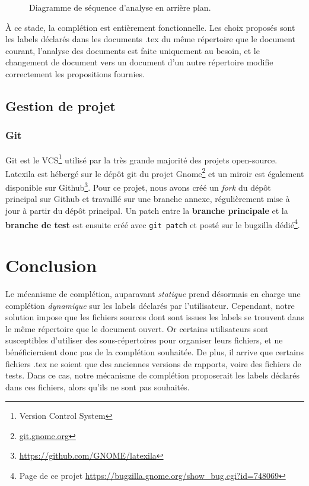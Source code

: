 \documentclass[a4paper,11pt]{report}
\begin{document}
\begin{figure}[h]
\label{fig:multiple_doc_completion}
\centering

\caption{Diagramme de séquence d'analyse en arrière plan.}
\end{figure}

À ce stade, la complétion est entièrement fonctionnelle.
Les choix proposés sont les labels déclarés dans les documents .tex du même répertoire que le document courant, l'analyse des documents est faite uniquement au besoin, et le changement de document vers un document d'un autre répertoire modifie correctement les propositions fournies.

\section{Gestion de projet} %

\subsection{Git}
\label{sub:git}
Git est le VCS\footnote{Version Control System} utilisé par la très grande majorité des projets open-source. Latexila est hébergé sur le dépôt git du projet Gnome\footnote{\url{git.gnome.org}}  et un miroir est également disponible sur Github\footnote{\url{https://github.com/GNOME/latexila}}.
Pour ce projet, nous avons créé un \textit{fork} du dépôt principal sur Github et travaillé sur une branche annexe, régulièrement mise à jour à partir du dépôt principal.
Un patch entre la \textbf{branche principale} et la \textbf{branche de test} est ensuite créé avec \texttt{git patch} et posté sur le bugzilla dédié\footnote{Page de ce projet \url{https://bugzilla.gnome.org/show_bug.cgi?id=748069}}.

\chapter{Conclusion}
Le mécanisme de complétion, auparavant \textit{statique} prend désormais en charge une complétion \textit{dynamique} sur les labels déclarés par l'utilisateur.
Cependant, notre solution impose que les fichiers sources dont sont issues les labels se trouvent dans le même répertoire que le document ouvert.
Or certains utilisateurs sont susceptibles d'utiliser des sous-répertoires pour organiser leurs fichiers, et ne bénéficieraient donc pas de la complétion souhaitée.
De plus, il arrive que certains fichiers .tex ne soient que des anciennes versions de rapports, voire des fichiers de tests. Dans ce cas, notre mécanisme de complétion proposerait les labels déclarés dans ces fichiers, alors qu'ils ne sont pas souhaités.
\end{document}
